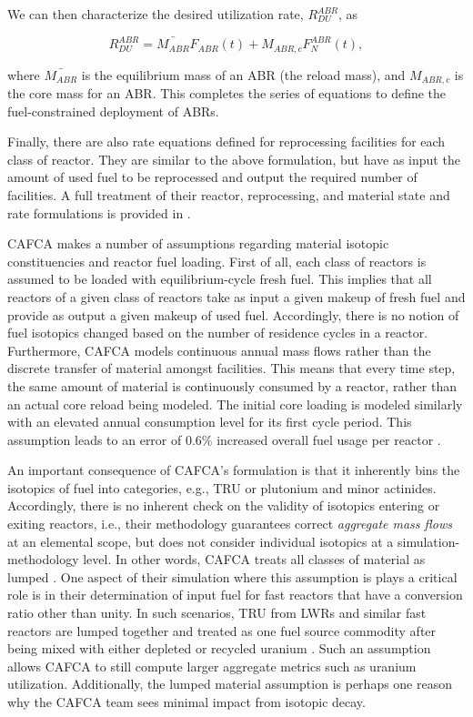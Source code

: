 We can then characterize the desired utilization rate, $R^{ABR}_{DU}$, as

\begin{equation}
 R^{ABR}_{DU} = \bar{M_{ABR}} F_{ABR}(t) + M_{ABR,c} F_N^{ABR}(t),
\end{equation}

where $\bar{M_{ABR}}$ is the equilibrium mass of an ABR (the reload mass), and
$M_{ABR,c}$ is the core mass for an ABR. This completes the series of equations
to define the fuel-constrained deployment of ABRs.

Finally, there are also rate equations defined for reprocessing facilities for
each class of reactor. They are similar to the above formulation, but have as
input the amount of used fuel to be reprocessed and output the required number
of facilities. A full treatment of their reactor, reprocessing, and material
state and rate formulations is provided in \cite{busquim_e_silva_system_2008}.

CAFCA makes a number of assumptions regarding material isotopic constituencies
and reactor fuel loading. First of all, each class of reactors is assumed to be
loaded with equilibrium-cycle fresh fuel. This implies that all reactors of a
given class of reactors take as input a given makeup of fresh fuel and provide
as output a given makeup of used fuel. Accordingly, there is no notion of fuel
isotopics changed based on the number of residence cycles in a
reactor. Furthermore, CAFCA models continuous annual mass flows rather than the
discrete transfer of material amongst facilities. This means that every time
step, the same amount of material is continuously consumed by a reactor, rather
than an actual core reload being modeled. The initial core loading is modeled
similarly with an elevated annual consumption level for its first cycle
period. This assumption leads to an error of 0.6\% increased overall fuel usage
per reactor \cite{guerin_impact_2009}.

An important consequence of CAFCA's formulation is that it inherently bins the
isotopics of fuel into categories, e.g., TRU or plutonium and minor
actinides. Accordingly, there is no inherent check on the validity of isotopics
entering or exiting reactors, i.e., their methodology guarantees
correct \textit{aggregate mass flows} at an elemental scope, but does not
consider individual isotopics at a simulation-methodology level. In other words,
CAFCA treats all classes of material as lumped \cite{guerin_impact_2009}. One
aspect of their simulation where this assumption is plays a critical role is in
their determination of input fuel for fast reactors that have a conversion ratio
other than unity. In such scenarios, TRU from LWRs and similar fast reactors are
lumped together and treated as one fuel source commodity after being mixed with
either depleted or recycled uranium \cite{guerin_impact_2009}. Such an
assumption allows CAFCA to still compute larger aggregate metrics such as
uranium utilization. Additionally, the lumped material assumption is perhaps one
reason why the CAFCA team sees minimal impact from isotopic decay.

